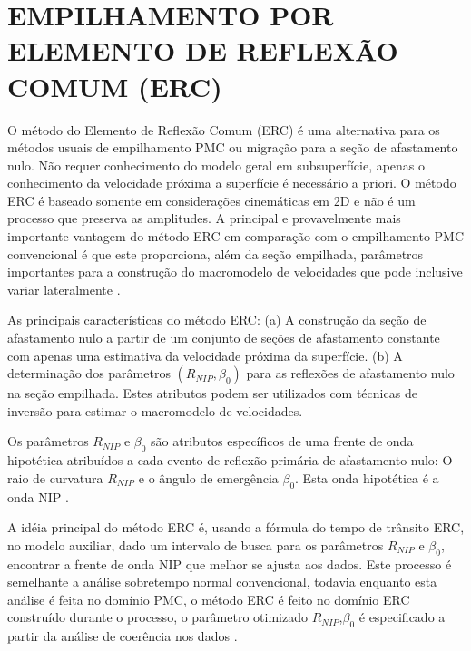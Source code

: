 %
% 
% 
% 
% 
% 
% 

\chapter{EMPILHAMENTO POR ELEMENTO DE REFLEXÃO COMUM (ERC)}
\label{cap:cre}

O método do Elemento de Reflexão Comum (ERC) é uma alternativa para os métodos usuais de empilhamento PMC ou
migração para a seção de afastamento nulo. Não requer conhecimento do modelo geral em subsuperfície, apenas
o conhecimento da velocidade próxima a superfície é necessário a priori.
O método ERC é baseado somente em considerações cinemáticas em 2D e não é
um processo que preserva as amplitudes.
A principal e provavelmente mais importante vantagem do método ERC em comparação com o empilhamento PMC convencional
é que este proporciona, além da seção empilhada, parâmetros importantes para a construção do macromodelo de 
velocidades que pode inclusive variar lateralmente \cite{cre}.

As principais características do método ERC:
(a) A construção da seção de afastamento nulo a partir de um conjunto de seções de afastamento constante
com apenas uma estimativa da velocidade próxima da superfície.
(b) A determinação dos parâmetros $(R_{NIP},\beta_0)$ para as reflexões de afastamento nulo na seção empilhada.
Estes atributos podem ser utilizados com técnicas de inversão para estimar o macromodelo de velocidades.

Os parâmetros $R_{NIP}$ e $\beta_0$ 
são atributos específicos de uma frente de onda hipotética atribuídos a cada evento de reflexão
primária de afastamento nulo: O raio de curvatura $R_{NIP}$ e o ângulo de emergência $\beta_0$. Esta onda hipotética é
a onda NIP \cite{hubral}.

A idéia principal do método ERC é, usando a fórmula do tempo de trânsito ERC, no modelo auxiliar, dado um intervalo
de busca para os parâmetros $R_{NIP}$ e $\beta_0$, encontrar a frente de onda NIP que melhor se ajusta aos dados.
Este processo é semelhante a análise sobretempo normal convencional, todavia enquanto esta análise é feita no
domínio PMC, o método ERC é feito no domínio ERC construído durante o processo, o parâmetro otimizado $R_{NIP}$,$\beta_0$
é especificado a partir da análise de coerência nos dados \cite{cre}.


